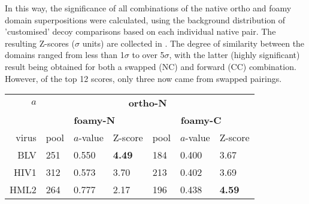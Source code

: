 In this way, the significance of all combinations of the native ortho and foamy domain
superpositions were calculated, using the background distribution of 'customised' decoy
comparisons based on each individual native pair.   The resulting Z-scores ($\sigma$ units)
are collected in .   The degree of similarity between the domains ranged from
less than 1$\sigma$ to over 5$\sigma$, with the latter (highly significant) result being
obtained for both a swapped (NC) and forward (CC) combination.   However, of the top 12
scores, only three now came from swapped pairings. 

\begin{table}
\centering
\begin{tabular}{r|lll|lll|}
$a$  & \multicolumn{6}{c|}{\bf ortho-N} \\
     & \multicolumn{3}{c|}{\bf foamy-N} & \multicolumn{3}{c|}{\bf foamy-C}  \\
\hline \hline
virus  & pool & $a$-value & Z-score & pool & $a$-value & Z-score \\
\hline
BLV    &  251  & 0.550 & {\bf 4.49} &  184  & 0.400 &      3.67  \\
HIV1   &  312  & 0.573 &      3.70  &  213  & 0.402 &      3.69  \\
HML2   &  264  & 0.777 &      2.17  &  196  & 0.438 & {\bf 4.59} \\

\end{tabular}
\end{table}
